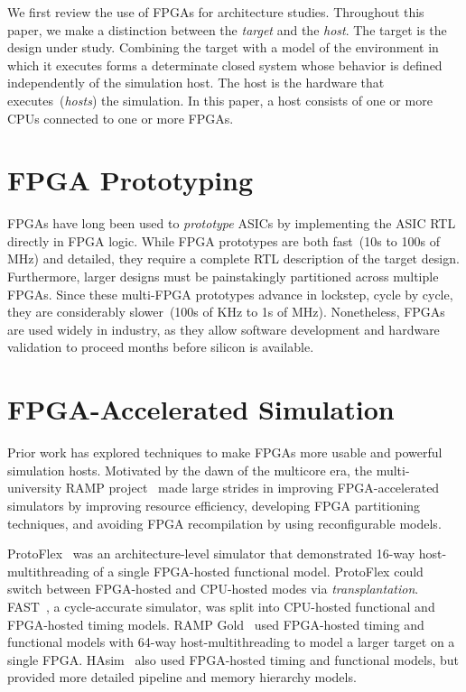 
We first review the use of FPGAs for architecture studies.  Throughout
this paper, we make a distinction between the \emph{target} and
the \emph{host}.  The target is the design under study.  Combining the
target with a model of the environment in which it executes forms a
determinate closed system whose behavior is defined independently of
the simulation host.  The host is the hardware that
executes~(\emph{hosts}) the simulation.  In this paper, a host
consists of one or more CPUs connected to one or more FPGAs.

\section{FPGA Prototyping}
FPGAs have long been used to \emph{prototype} ASICs by implementing
the ASIC RTL directly in FPGA logic.  While FPGA prototypes are both
fast~(10s to 100s of MHz) and detailed, they require a complete RTL
description of the target design. Furthermore, larger designs must be
painstakingly partitioned across multiple FPGAs. Since these
multi-FPGA prototypes advance in lockstep, cycle by cycle, they are
considerably slower~(100s of KHz to 1s of MHz). Nonetheless, FPGAs are used widely
in industry, as they allow software development and hardware
validation to proceed months before silicon is available.

\section{FPGA-Accelerated Simulation}

Prior work has explored techniques to make FPGAs more usable and
powerful simulation hosts.  Motivated by the dawn of the multicore
era, the multi-university RAMP project~\cite{RAMP} made large strides
in improving FPGA-accelerated simulators by improving resource
efficiency, developing FPGA partitioning techniques, and avoiding FPGA
recompilation by using reconfigurable models.

ProtoFlex~\cite{protoflex} was an architecture-level simulator that
demonstrated 16-way host-multithreading of a single FPGA-hosted functional model.
ProtoFlex could switch between FPGA-hosted and CPU-hosted modes via
\emph{transplantation}. FAST~\cite{FAST}, a cycle-accurate simulator, was
split into CPU-hosted functional and FPGA-hosted timing models.  RAMP
Gold~\cite{RAMPGold} used FPGA-hosted timing and functional models
with 64-way host-multithreading to model a larger target on a single
FPGA.  HAsim~\cite{HASIM} also used FPGA-hosted timing and functional
models, but provided more detailed pipeline and memory hierarchy
models.

